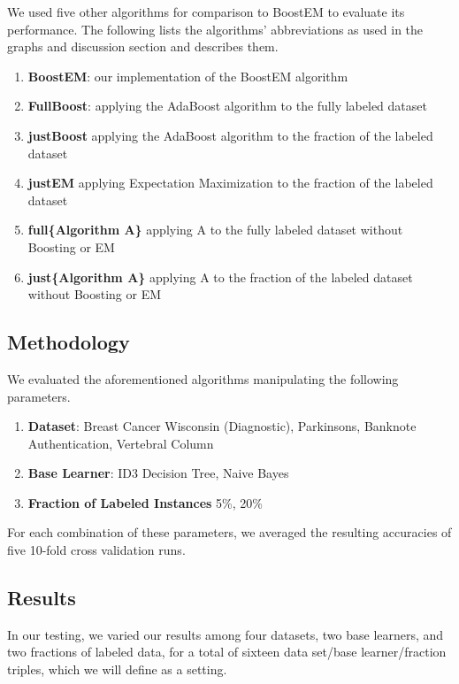 \documentclass{sig-alternate}
\begin{document}
We used five other algorithms for comparison to BoostEM to evaluate its performance. The following lists the algorithms' abbreviations as used in the graphs and discussion section and describes them.

\begin{enumerate}
\item \textbf{BoostEM}: our implementation of the BoostEM algorithm
\item \textbf{FullBoost}: applying the AdaBoost algorithm to the fully labeled dataset
\item \textbf{justBoost} applying the AdaBoost algorithm to the fraction of the labeled dataset
\item \textbf{justEM} applying Expectation Maximization to the fraction of the labeled dataset
\item \textbf{full\{Algorithm A\}} applying A to the fully labeled dataset without Boosting or EM
\item \textbf{just\{Algorithm A\}} applying A to the fraction of the labeled dataset without Boosting or EM
\end{enumerate}

\subsection{Methodology}

We evaluated the aforementioned algorithms manipulating the following parameters.

\begin{enumerate}
\item \textbf{Dataset}: Breast Cancer Wisconsin (Diagnostic), Parkinsons, Banknote Authentication, Vertebral Column
\item \textbf{Base Learner}: ID3 Decision Tree, Naive Bayes
\item \textbf{Fraction of Labeled Instances} 5\%, 20\%
\end{enumerate}

For each combination of these parameters, we averaged the resulting accuracies of five 10-fold cross validation runs. 

\subsection{Results}

In our testing, we varied our results among four datasets, two base learners, and two fractions of labeled data, for a total of sixteen data set/base learner/fraction triples, which we will define as a setting.  
\end{document}

